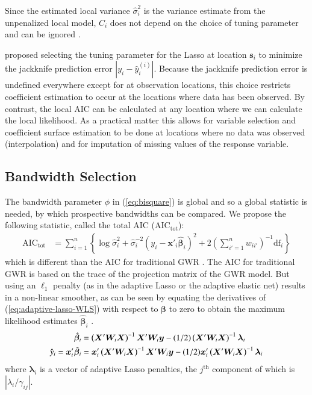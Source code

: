 \documentclass[authoryear, review, 11pt]{elsarticle}
\begin{document}
	Since the estimated local variance $\hat{\sigma}_i^2$ is the variance estimate from the unpenalized local model, $C_i$ does not depend on the choice of tuning parameter and can be ignored \citep{Zou:2007}.
	
	\cite{Wheeler:2009} proposed selecting the tuning parameter for the Lasso at location $\bm{s}_i$ to minimize the jackknife prediction error $|y_i - \hat{y}_i^{(i)}|$. Because the jackknife prediction error is undefined everywhere except for at observation locations, this choice restricts coefficient estimation to occur at the locations where data has been observed. By contrast, the local AIC can be calculated at any location where we can calculate the local likelihood. As a practical matter this allows for variable selection and coefficient surface estimation to be done at locations where no data was observed (interpolation) and for imputation of missing values of the response variable.
	 
	\subsection{Bandwidth Selection}
	The bandwidth parameter $\phi$ in (\ref{eq:bisquare}) is global and so a global statistic is needed, by which prospective bandwidths can be compared. We propose the following statistic, called the total AIC ($\mbox{AIC}_{\text{tot}}$):
	\begin{align}\label{eq:total-AIC}
		\mbox{AIC}_{\mbox{tot}} &= \sum_{i=1}^n \left\{ \log \hat{\sigma}_i^2 + \hat{\sigma}_i^{-2} \left(y_i - \bm{x}'_i \hat{\bm{\beta}}_i \right)^2 + 2 \left(\sum_{i'=1}^n w_{ii'} \right)^{-1} \mbox{df}_i \right\}
	\end{align}	
	which is different than the AIC for traditional GWR \citep{Fotheringham:2002}. The AIC for traditional GWR is based on the trace of the projection matrix of the GWR model. But using an $\ell_1$ penalty (as in the adaptive Lasso or the adaptive elastic net) results in a non-linear smoother, as can be seen by equating the derivatives of (\ref{eq:adaptive-lasso-WLS}) with respect to $\bm{\beta}$ to zero to obtain the maximum likelihood estimates $\hat{\bm{\beta}}_i$ \citep{Zou:2007}.
	\begin{align}
		\hat{\bm{\beta}}_i &= \left( \bm{X}'\bm{W}_i\bm{X} \right)^{-1}  \bm{X}'\bm{W}_i\bm{y}  - (1/2) \left(\bm{X}'\bm{W}_i\bm{X} \right)^{-1} \bm{\lambda}_i \notag \\
		\hat{y}_i = \bm{x}_i' \hat{\bm{\beta}}_i &=  \bm{x}_i' \left( \bm{X}'\bm{W}_i\bm{X} \right)^{-1}  \bm{X}'\bm{W}_i\bm{y}  - (1/2) \bm{x}_i' \left(\bm{X}'\bm{W}_i\bm{X} \right)^{-1} \bm{\lambda}_i \notag
	\end{align}
	where $\bm{\lambda}_i$ is a vector of adaptive Lasso penalties, the $j^{\text{th}}$ component of which is $|\lambda_i / \gamma_{ij}|$.
	
\end{document}

